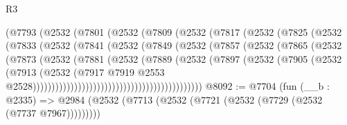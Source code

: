 \begin{lexlean}{R3}
\begin{coremodule}
                            (@7793
                              (@2532
                                (@7801
                                  (@2532
                                    (@7809
                                      (@2532
                                        (@7817
                                          (@2532
                                            (@7825
                                              (@2532
                                                (@7833
                                                  (@2532
                                                    (@7841
                                                      (@2532
                                                        (@7849
                                                          (@2532
                                                            (@7857
                                                              (@2532
                                                                (@7865
                                                                  (@2532
                                                                    (@7873
                                                                      (@2532
                                                                        (@7881
                                                                          (@2532
                                                                            (@7889
                                                                              (@2532
                                                                                (@7897
                                                                                  (@2532
                                                                                    (@7905
                                                                                      (@2532
                                                                                        (@7913
                                                                                          (@2532
                                                                                            (@7917
                                                                                              @7919
                                                                                              @2553
                                                                                              @2528)))))))))))))))))))))))))))))))))))))))))))))
@8092 := @7704
    (fun (__b : @2335) =>
    @2984 (@2532 (@7713 (@2532 (@7721 (@2532 (@7729 (@2532 (@7737 @7967)))))))))

\end{coremodule}
\end{lexlean}
